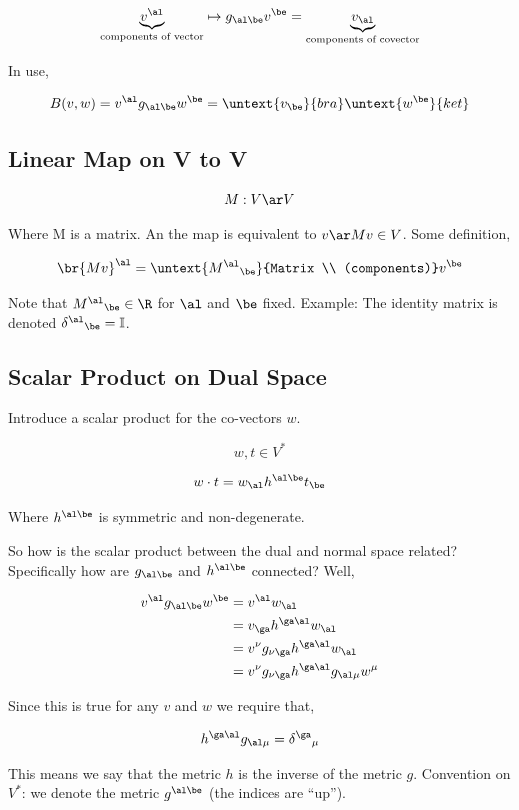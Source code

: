 \documentclass{article}
\begin{document}
\[ \underbrace{v^\al}_{\text{components of vector}} \mapsto g_{\al\be} v^\be = \underbrace{v_\al}_{\text{components of covector}} \]

In use,

\[ B(v,w) = v^\al g_{\al\be} w^\be = \untext{v_\be}{bra} \untext{w^\be}{ket} \]

\subsection{Linear Map on V to V}

\[ M : V \ar V \]

Where M is a matrix. An the map is equivalent to $v \ar Mv \in V$. Some definition,

\[ \br{Mv}^\al = \untext{{M^\al}_\be}{Matrix \\ (components)} v^\be \]

Note that ${M^\al}_\be \in \R$ for $\al$ and $\be$ fixed. Example: The identity matrix is denoted ${\delta^\al}_\be = \mathbb{I}$.

\subsection{Scalar Product on Dual Space}

Introduce a scalar product for the co-vectors $w$.

\[ w, t \in V^* \]

\[ w \cdot t = w_\al h^{\al\be} t_\be \]

Where $h^{\al\be}$ is symmetric and non-degenerate.

So how is the scalar product between the dual and normal space related? Specifically how are $g_{\al\be}$ and $h^{\al\be}$ connected? Well,

\begin{align*}
   v^\al g_{\al\be} w^\be &= v^\al w_\al \\
   &= v_\ga h^{\ga\al} w_\al \\
   &= v^\nu g_{\nu\ga} h^{\ga\al} w_\al \\
   &= v^\nu g_{\nu\ga} h^{\ga\al} g_{\al\mu} w^\mu
\end{align*}

Since this is true for any $v$ and $w$ we require that,

\[ h^{\ga\al} g_{\al\mu} = {\delta^\ga}_\mu \]

This means we say that the metric $h$ is the inverse of the metric $g$. Convention on $V^*$: we denote the metric $g^{\al\be}$ (the indices are ``up''). \\
\end{document}

